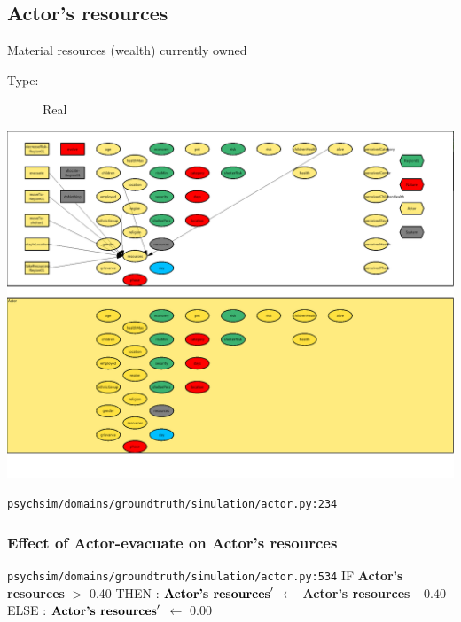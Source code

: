 \documentclass{article}%
\begin{document}
\subsection{Actor's resources}%
\label{subsec:Actor's resources}%
Material resources (wealth) currently owned%
\begin{description}%
\item[Type:]%
Real%
\end{description}%
\includegraphics[width=\textwidth]{images/resourcesOfActor.png}%
\begin{flushleft}%
\verb|psychsim/domains/groundtruth/simulation/actor.py:234|%
\end{flushleft}%
\subsubsection{Effect of Actor{-}evacuate on Actor's resources}%
\label{ssubsec:Effect of Actor{-}evacuate on Actor's resources}%
\begin{flushleft}%
\verb|psychsim/domains/groundtruth/simulation/actor.py:534|%
\linebreak%
IF %
\textbf{Actor's resources}%
$>$%
0.40%
\linebreak%
\hspace*{2em}%
THEN %
: %
$\mbox{\textbf{Actor's resources}} '$%
$\leftarrow$%
\textbf{Actor's resources}%
${-}0.40$%
\linebreak%
\hspace*{2em}%
ELSE %
: %
$\mbox{\textbf{Actor's resources}} '$%
$\leftarrow$%
0.00%
\end{flushleft}
\end{document}
